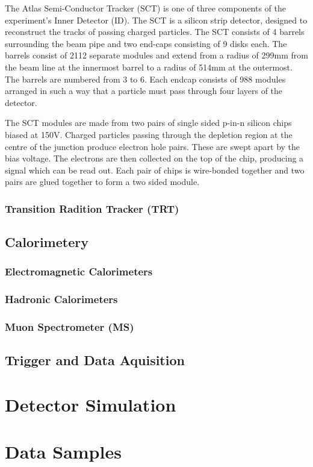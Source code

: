 \label{sec:Detector-SCT}

The Atlas Semi-Conductor Tracker (SCT) is one of three components of the experiment's Inner Detector (ID). The SCT is a silicon strip detector, designed to reconstruct the tracks of passing charged particles. The SCT consists of 4 barrels surrounding the beam pipe and two end-caps consisting of 9 disks each. The barrels consist of 2112 separate modules and extend from a radius of 299mm from the beam line at the innermost barrel to a radius of 514mm at the outermost. The barrels are numbered from 3 to 6. Each endcap consists of 988 modules arranged in such a way that a particle must pass through four layers of the detector.

The SCT modules are made from two pairs of single sided p-in-n silicon chips biased at 150V. Charged particles passing through the depletion region at the centre of the junction produce electron hole pairs. These are swept apart by the bias voltage. The electrons are then collected on the top of the chip, producing a signal which can be read out. Each pair of chips is wire-bonded together and two pairs are glued together to form a two sided module.

\subsubsection{Transition Radition Tracker (TRT)}
\subsection{Calorimetery}
\subsubsection{Electromagnetic Calorimeters}
\subsubsection{Hadronic Calorimeters}
\subsubsection{Muon Spectrometer (MS)}
\subsection{Trigger and Data Aquisition}
\section{Detector Simulation}
\section{Data Samples}
